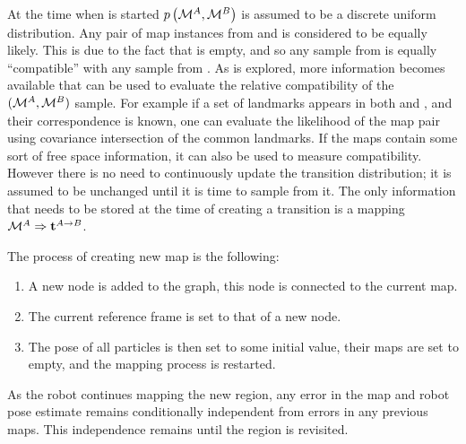 At the time when \mapB is started $\prob{\mapA,\mapB}$ is assumed to
be a discrete uniform distribution. Any pair of map instances from
\mapA and \mapB is considered to be equally likely. This is due
to the fact that \mapB is empty, and so any sample from \mapB is
equally ``compatible'' with any sample from \mapA. As \mapB is
explored, more information becomes available that can be used to
evaluate the relative compatibility of the $(\mapA,\mapB)$ sample. For
example if a set of landmarks appears in both \mapA and \mapB, and
their correspondence is known, one can evaluate the likelihood of the
map pair using covariance intersection \cite{cov_intersection}
of the common landmarks. If the maps contain some sort of free space
information, it can also be used to measure compatibility. However
there is no need to continuously update the transition distribution;
it is assumed to be unchanged until it is time to sample from it. The
only information that needs to be stored at the time of creating a
transition is a mapping $\mapA \Rightarrow \tr{}{A}{B}$.


The process of creating new map is the following:

\begin{enumerate}

\item A new node is added to the graph, this node is connected to the
  current map.

\item The current reference frame is set to that of a new node.

%
\item The pose of all particles is then set to some initial value,
  their maps are set to empty, and the mapping process is restarted.

\end{enumerate}

As the robot continues mapping the new region, any error in the map
and robot pose estimate remains conditionally independent from errors
in any previous maps. This independence remains until the region is
revisited.


